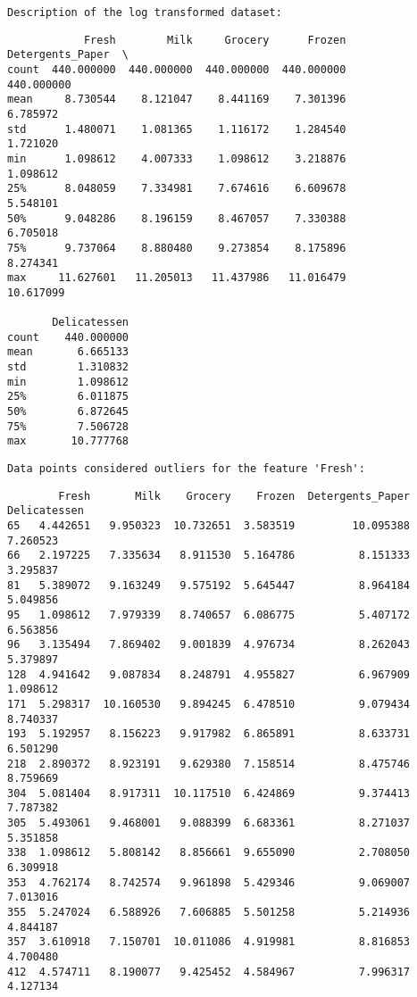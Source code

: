 \documentclass{article}
\begin{document}
    \begin{Verbatim}[commandchars=\\\{\}]
Description of the log transformed dataset:
    \end{Verbatim}

    
    \begin{verbatim}
            Fresh        Milk     Grocery      Frozen  Detergents_Paper  \
count  440.000000  440.000000  440.000000  440.000000        440.000000   
mean     8.730544    8.121047    8.441169    7.301396          6.785972   
std      1.480071    1.081365    1.116172    1.284540          1.721020   
min      1.098612    4.007333    1.098612    3.218876          1.098612   
25%      8.048059    7.334981    7.674616    6.609678          5.548101   
50%      9.048286    8.196159    8.467057    7.330388          6.705018   
75%      9.737064    8.880480    9.273854    8.175896          8.274341   
max     11.627601   11.205013   11.437986   11.016479         10.617099   

       Delicatessen  
count    440.000000  
mean       6.665133  
std        1.310832  
min        1.098612  
25%        6.011875  
50%        6.872645  
75%        7.506728  
max       10.777768  
    \end{verbatim}

    
    \begin{Verbatim}[commandchars=\\\{\}]
Data points considered outliers for the feature 'Fresh':
    \end{Verbatim}

    
    \begin{verbatim}
        Fresh       Milk    Grocery    Frozen  Detergents_Paper  Delicatessen
65   4.442651   9.950323  10.732651  3.583519         10.095388      7.260523
66   2.197225   7.335634   8.911530  5.164786          8.151333      3.295837
81   5.389072   9.163249   9.575192  5.645447          8.964184      5.049856
95   1.098612   7.979339   8.740657  6.086775          5.407172      6.563856
96   3.135494   7.869402   9.001839  4.976734          8.262043      5.379897
128  4.941642   9.087834   8.248791  4.955827          6.967909      1.098612
171  5.298317  10.160530   9.894245  6.478510          9.079434      8.740337
193  5.192957   8.156223   9.917982  6.865891          8.633731      6.501290
218  2.890372   8.923191   9.629380  7.158514          8.475746      8.759669
304  5.081404   8.917311  10.117510  6.424869          9.374413      7.787382
305  5.493061   9.468001   9.088399  6.683361          8.271037      5.351858
338  1.098612   5.808142   8.856661  9.655090          2.708050      6.309918
353  4.762174   8.742574   9.961898  5.429346          9.069007      7.013016
355  5.247024   6.588926   7.606885  5.501258          5.214936      4.844187
357  3.610918   7.150701  10.011086  4.919981          8.816853      4.700480
412  4.574711   8.190077   9.425452  4.584967          7.996317      4.127134
    \end{verbatim}
\end{document}
